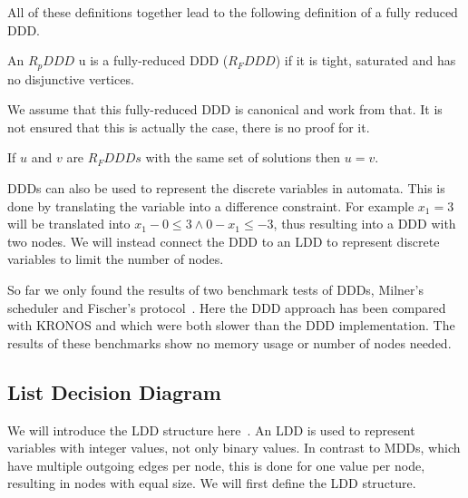 All of these definitions together lead to the following definition of a fully reduced DDD.
 
\begin{mydef}
\label{def:RFDDD}
An $R_pDDD$ u is a fully-reduced DDD ($R_FDDD$) if it is tight, saturated and has no disjunctive vertices.
\end{mydef}

We assume that this fully-reduced DDD is canonical and work from that. It is not ensured that this is actually the case, there is no proof for it.

\begin{myconjecture}
\label{def:Canonical-ddd}
If $u$ and $v$ are $R_FDDDs$ with the same set of solutions then $u = v$.
\end{myconjecture}


DDDs can also be used to represent the discrete variables in automata. This is done by translating the variable into a difference constraint. For example $x_1 = 3$ will be translated into $x_1 - 0 \leq 3 \wedge 0 - x_1 \leq -3$, thus resulting into a DDD with two nodes. We will instead connect the DDD to an LDD to represent discrete variables to limit the number of nodes.

So far we only found the results of two benchmark tests of DDDs, Milner's scheduler and Fischer's protocol~\cite{Møller200253}. Here the DDD approach has been compared with KRONOS and \uppaal{} which were both slower than the DDD implementation. The results of these benchmarks show no memory usage or number of nodes needed.

\subsection{List Decision Diagram}
We will introduce the LDD structure here~\cite{sylvan}. An LDD is used to represent variables with integer values, not only binary values. In contrast to MDDs\cite{129849}, which have multiple outgoing edges per node, this is done for one value per node, resulting in nodes with equal size. We will first define the LDD structure.

